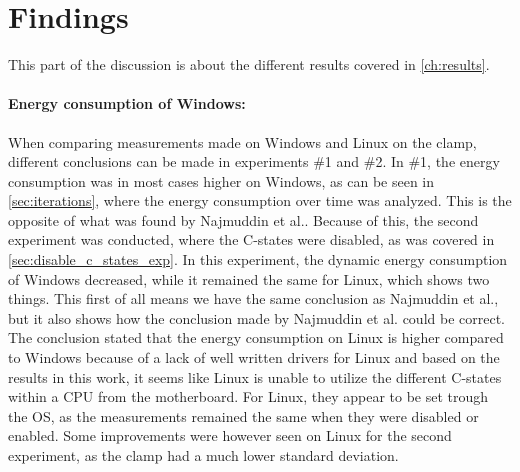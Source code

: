 \section{Findings}

This part of the discussion is about the different results covered in \cref{ch:results}.

\paragraph*{Energy consumption of Windows:} When comparing measurements made on Windows and Linux on the clamp, different conclusions can be made in experiments \#1 and \#2. In \#1, the energy consumption was in most cases higher on Windows, as can be seen in \cref{sec:iterations}, where the energy consumption over time was analyzed. This is the opposite of what was found by Najmuddin et al.\cite[]{Najmuddin2021}. Because of this, the second experiment was conducted, where the C-states were disabled, as was covered in \cref{sec:disable_c_states_exp}. In this experiment, the dynamic energy consumption of Windows decreased, while it remained the same for Linux, which shows two things. This first of all means we have the same conclusion as Najmuddin et al.\cite[]{Najmuddin2021}, but it also shows how the conclusion made by Najmuddin et al.\cite[]{Najmuddin2021} could be correct. The conclusion stated that the energy consumption on Linux is higher compared to Windows because of a lack of well written drivers for Linux and based on the results in this work, it seems like Linux is unable to utilize the different C-states within a CPU from the motherboard. For Linux, they appear to be set trough the OS, as the measurements remained the same when they were disabled or enabled. Some improvements were however seen on Linux for the second experiment, as the clamp had a much lower standard deviation.

